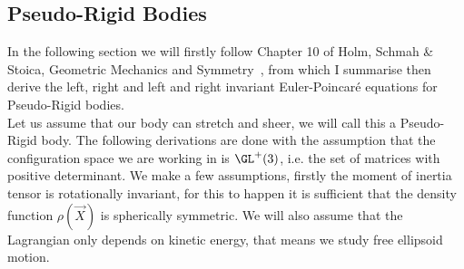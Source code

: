 
\subsection{Pseudo-Rigid Bodies}
In the following section we will firstly follow Chapter 10 of Holm, Schmah \& Stoica, Geometric Mechanics and Symmetry~\cite{holm_schmah_stoica_2009}, from which I summarise then derive the left, right and left and right invariant Euler-Poincar\'e equations for Pseudo-Rigid bodies.\\ %

\noindent
Let us assume that our body can stretch and sheer, we will call this a Pseudo-Rigid body. The following derivations are done with the assumption that the configuration space we are working in is $\GL^+(3)$, i.e. the set of matrices with positive determinant. We make a few assumptions, firstly the moment of inertia tensor is rotationally invariant, for this to happen it is sufficient that the density function $\rho(\vec X)$ is spherically symmetric. We will also assume that the Lagrangian only depends on kinetic energy, that means we study free ellipsoid motion.\\

